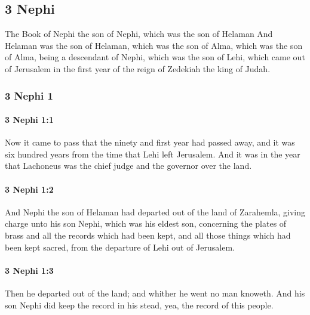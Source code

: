 \subsection{3 Nephi}
	\label{3NEPHI}
	
	The Book of Nephi
	the son of Nephi,
	which was the son of Helaman
	And Helaman was the son of Helaman,
	which was the son of Alma,
	which was the son of Alma,
	being a descendant of Nephi,
	which was the son of Lehi,
	which came out of Jerusalem in the first year
	of the reign of Zedekiah the king of Judah.

	\subsubsection{3 Nephi 1} %
		\label{3NEPHI-1}
		
		\paragraph{3 Nephi 1:1} %
			\label{3NEPHI-1-1}

			Now it came to pass that the ninety and first year had passed away,
			and it was six hundred years from the time that Lehi left Jerusalem.
			And it was in the year that Lachoneus was the chief judge
			and the governor over the land.

		\paragraph{3 Nephi 1:2} %
			\label{3NEPHI-1-2}

			And Nephi the son of Helaman had departed out of the land of Zarahemla,
			giving charge unto his son Nephi, which was his eldest son,
			concerning the plates of brass and all the records which had been kept,
			and all those things which had been kept sacred,
			from the departure of Lehi out of Jerusalem.

		\paragraph{3 Nephi 1:3} %
			\label{3NEPHI-1-3}

			Then he departed out of the land;
			and whither he went no man knoweth.
			And his son Nephi did keep the record in his stead,
			yea, the record of this people.

